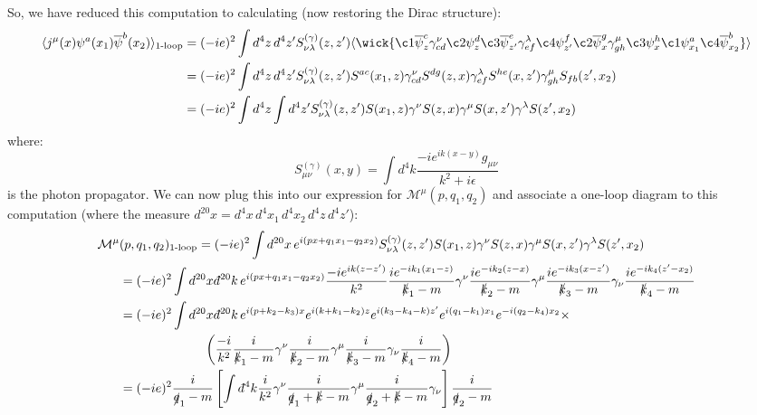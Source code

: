\documentclass[11pt, oneside]{article}   	%
\theoremstyle{definition}
\newcommand{\dbar}{d\hspace*{-0.08em}\bar{}\hspace*{0.1em}}
\begin{document}
So, we have reduced this computation to calculating (now restoring the Dirac structure):
\begin{align}
	\langle j^\mu(x) \psi^a(x_1)\overline \psi^b(x_2)\rangle_\textnormal{1-loop} &= (-ie)^2 \int d^4z\,d^4z' S^{(\gamma)}_{\nu 
	\lambda}(z, z') \langle \wick{
	\c1{\overline \psi_z^c} \gamma^\nu_{cd} \c2{\psi_z^d} \c3{\overline\psi^e_{z'}} \gamma^\lambda_{ef} \c4{\psi_{z'}^f} 
	\c2{\overline\psi_x^g} \gamma^\mu_{gh} \c3{\psi_x^h} \c1{\psi_{x_1}^a}
	\c4{\overline\psi_{x_2}^b}
	}\rangle \nonumber \\
	&= (-ie)^2 \int d^4 z\, d^4 z' S^{(\gamma)}_{\nu\lambda}(z, z') S^{ac}(x_1, z) \gamma^\nu_{cd} S^{dg}(z, x) 
	\gamma^\lambda_{ef}S^{he}(x, z') \gamma_{gh}^\mu S_{fb}(z', x_2) \nonumber \\
	&= (-ie)^2 \int d^4 z \int d^4 z' S_{\nu\lambda}^{(\gamma)}(z, z') S(x_1, z)\gamma^\nu S(z, x) \gamma^\mu S(x, z') 
	\gamma^\lambda S(z', x_2)
\end{align}
where:
\begin{equation}
	S^{(\gamma)}_{\mu\nu}(x, y) = \int d^4k\frac{-ie^{ik(x - y)}g_{\mu\nu}}{k^2 + i\epsilon}
\end{equation}
is the photon propagator. We can now plug this into our expression for $\mathcal M^\mu(p, q_1, q_2)$ and associate a 
one-loop diagram to this computation (where the measure $d^{20}x = d^4x\,d^4x_1\,d^4 x_2\,d^4z\,d^4z'$):
\begin{align}
	\mathcal M^\mu&(p, q_1, q_2)_\textnormal{1-loop} = (-ie)^2\int d^{20} x\,e^{i(px + q_1 x_1 - q_2 x_2)} 
	S_{\nu\lambda}^{(\gamma)}(z, z') S(x_1, z)\gamma^\nu S(z, x) \gamma^\mu S(x, z') \gamma^\lambda S(z', x_2) 
	\nonumber \\
	&= (-ie)^2 \int d^{20}x \dbar^{20}k\, e^{i(px + q_1 x_1 - q_2 x_2)}\frac{-ie^{ik(z - z')}}{k^2}
	\frac{ie^{-ik_1(x_1 - z)}}{\slashed k_1 - m}\gamma^\nu \frac{ie^{-ik_2(z - x)}}{\slashed k_2 - m} \gamma^\mu \frac{ie^{-ik_3 
	(x - z')}}{\slashed k_3 - m} \gamma_\nu \frac{ie^{-ik_4 (z' - x_2)}}{\slashed k_4 - m} \nonumber \\
	&= (-ie)^2 \int d^{20}x \dbar^{20} k\, e^{i(p + k_2 - k_3)x}e^{i(k + k_1 - k_2)z} e^{i(k_3 - k_4 - k)z'}e^{i(q_1 - k_1)x_1}
	e^{-i(q_2 - k_4)x_2} \times \nonumber \\
	&\;\;\;\;\;\;\;\;\;\;\;\;\;\;\;\;\;\;\;\;\;\;\;\; \left(\frac{-i}{k^2} \frac{i}{\slashed k_1 - m} \gamma^\nu \frac{i}{\slashed k_2 - m}
	\gamma^\mu\frac{i}{\slashed k_3 - m} \gamma_\nu \frac{i}{\slashed k_4 - m}\right) \nonumber \\
	&= (-ie)^2 \frac{i}{\slashed q_1 - m}\left[\int\dbar^4 k \frac{i}{k^2}\gamma^\nu \frac{i}{\slashed q_1 + \slashed k - m}
	\gamma^\mu \frac{i}{\slashed q_2 + \slashed k - m}\gamma_\nu\right]\frac{i}{\slashed q_2 - m}
\end{align}
\end{document}
